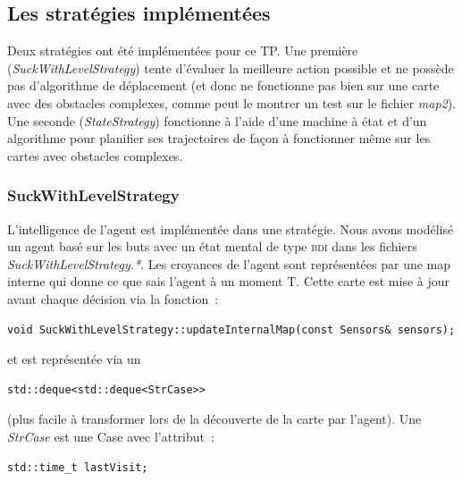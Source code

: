 \documentclass{article}
\begin{document}
\subsection{Les stratégies implémentées}

Deux stratégies ont été implémentées pour ce TP. Une première
(\emph{SuckWithLevelStrategy}) tente d'évaluer la meilleure action possible et
ne possède pas d'algorithme de déplacement (et donc ne fonctionne pas bien sur
une carte avec des obstacles complexes, comme peut le montrer un test sur le
fichier \emph{map2}). Une seconde (\emph{StateStrategy}) fonctionne à l'aide
d'une machine à état et d'un algorithme pour planifier ses trajectoires de
façon à fonctionner même sur les cartes avec obstacles complexes.

\subsubsection{SuckWithLevelStrategy}

L'intelligence de l'agent est implémentée dans une stratégie. Nous avons modélisé un agent basé sur les buts avec un état mental de type \textsc{bdi} dans les fichiers \emph{SuckWithLevelStrategy.*}. Les croyances de l'agent sont représentées par une map interne qui donne ce que sais l'agent à un moment T. Cette carte est mise à jour avant chaque décision via la fonction~:
\begin{verbatim}
void SuckWithLevelStrategy::updateInternalMap(const Sensors& sensors);
\end{verbatim}
et est représentée via un \begin{verbatim}std::deque<std::deque<StrCase>>\end{verbatim} (plus facile à transformer lors de la découverte de la carte par l'agent). Une \emph{StrCase} est une Case avec l'attribut~:
\begin{verbatim}
std::time_t lastVisit;
\end{verbatim}
\end{document}
